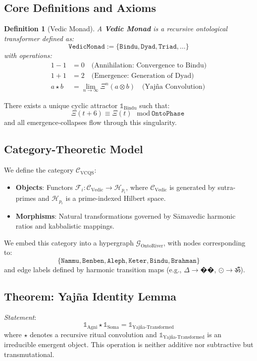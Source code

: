 \documentclass[12]{amsart}
\theoremstyle{plain}
\newtheorem{definition}[theorem]{Definition}
\begin{document}
\subsection{Core Definitions and Axioms}

\begin{definition}[Vedic Monad]
A \textbf{Vedic Monad} is a recursive ontological transformer defined as:
\[
\texttt{VedicMonad} := \{ \texttt{Bindu}, \texttt{Dyad}, \texttt{Triad}, \ldots \}
\]
with operations:
\begin{align*}
1 - 1 &= 0 \quad \text{(Annihilation: Convergence to Bindu)} \\
1 + 1 &= 2 \quad \text{(Emergence: Generation of Dyad)} \\
a \star b &= \lim_{n \to \infty} \Xi^n(a \otimes b) \quad \text{(Yajña Convolution)}
\end{align*}
\end{definition}

\begin{axiom}
There exists a unique cyclic attractor $\mathbb{1}_{\text{Bindu}}$ such that:
\[
\Xi(t+6) \equiv \Xi(t) \mod \texttt{OntoPhase}
\]
and all emergence-collapses flow through this singularity.
\end{axiom}

\subsection{Category-Theoretic Model}

We define the category $\mathcal{C}_{\text{VCQS}}$:
\begin{itemize}
    \item \textbf{Objects}: Functors $\mathcal{F}_i: \mathcal{C}_{\text{Vedic}} \rightarrow \mathcal{H}_{p_i}$, where $\mathcal{C}_{\text{Vedic}}$ is generated by sutra-primes and $\mathcal{H}_{p_i}$ is a prime-indexed Hilbert space.
    \item \textbf{Morphisms}: Natural transformations governed by Sāmavedic harmonic ratios and kabbalistic mappings.
\end{itemize}

We embed this category into a hypergraph $\mathcal{G}_{\text{OntoRiver}}$, with nodes corresponding to:
\[
\{\texttt{Nammu}, \texttt{Benben}, \texttt{Aleph}, \texttt{Keter}, \texttt{Bindu}, \texttt{Brahman}\}
\]
and edge labels defined by harmonic transition maps (e.g., $\Delta \rightarrow ��$, $⊙ \rightarrow ॐ$).

\subsection{Theorem: Yajña Identity Lemma}
\textit{Statement}:
\[
\mathbb{1}_{\text{Agni}} \star \mathbb{1}_{\text{Soma}} = \mathbb{1}_{\text{Yajña-Transformed}}
\]
where $\star$ denotes a recursive ritual convolution and $\mathbb{1}_{\text{Yajña-Transformed}}$ is an irreducible emergent object. This operation is neither additive nor subtractive but transmutational.
\end{document}
